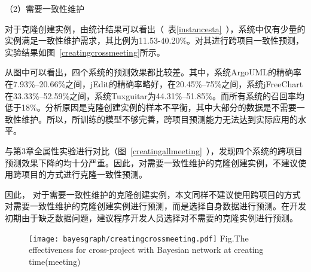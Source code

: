 （2）需要一致性维护

对于克隆创建实例，由统计结果可以看出（~表\ref{instancesta}~），系统中仅有少量的实例满足一致性维护需求，其比例为11.53-40.20\%。对其进行跨项目一致性预测，实验结果如图~\ref{creatingcrossmeeting}所示。

从图中可以看出，四个系统的预测效果都比较差。其中，系统ArgoUML的精确率在7.93\%--20.66\%之间，jEdit的精确率略好，在20.45\%--75\%之间，系统jFreeChart在33.33\%--52.59\%之间，系统Tuxguitar为44.31\%--51.85\%。而所有系统的召回率均低于18\%。分析原因是克隆创建实例的样本不平衡，其中大部分的数据是不需要一致性维护。所以，所训练的模型不够完善，跨项目预测能力无法达到实际应用的水平。

与第3章全属性实验进行对比（图~\ref{creatingallmeeting}~），发现四个系统的跨项目预测效果下降的均十分严重。因此，对需要一致性维护的克隆创建实例，不建议使用跨项目的方式进行克隆一致性预测。

因此， 对于需要一致性维护的克隆创建实例，本文同样不建议使用跨项目的方式对需要一致性维护的克隆创建实例进行预测，而是选择自身数据进行预测。在开发初期由于缺乏数据问题，建议程序开发人员选择对不需要的克隆实例进行预测。

\begin{figure}[htbp]
\centering
\texttt{[image: bayesgraph/creatingcrossmeeting.pdf]}
{Fig.$\!$}{The effectiveness for cross-project with Bayesian network at creating time(meeting)}
\vspace{-1em}
\end{figure}


